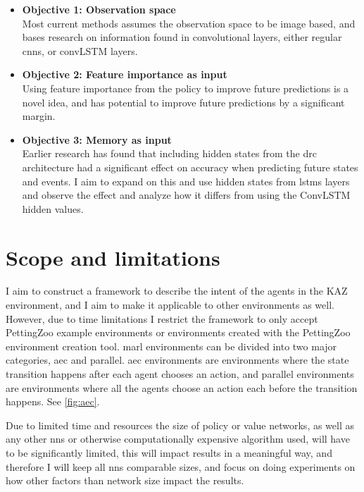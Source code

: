 \documentclass[UKenglish]{uiomasterthesis}
\begin{document}
\begin{itemize}

    \item \textbf{Objective 1: Observation space}\\
        Most current methods assumes the observation space to be image based, and bases research on information found in convolutional layers, either regular \acp{cnn}, or convLSTM layers.

    \item \textbf{Objective 2: Feature importance as input}\\
        Using feature importance from the policy to improve future predictions is a novel idea, and has potential to improve future predictions by a significant margin.

    \item \textbf{Objective 3: Memory as input}\\
        Earlier research has found that including hidden states from the \ac{drc} architecture had a significant effect on accuracy when predicting future states and events. I aim to expand on this and use hidden states from \acp{lstm} layers and observe the effect and analyze how it differs from using the ConvLSTM hidden values.

\end{itemize}


\section{Scope and limitations}
I aim to construct a framework to describe the intent of the agents in the KAZ environment, and I aim to make it applicable to other environments as well. However, due to time limitations I restrict the framework to only accept PettingZoo example environments or environments created with the PettingZoo environment creation tool. \ac{marl} environments can be divided into two major categories, \ac{aec} and parallel. \ac{aec} environments are environments where the state transition happens after each agent chooses an action, and parallel environments are environments where all the agents choose an action each before the transition happens. See \cref{fig:aec}.

Due to limited time and resources the size of policy or value networks, as well as any other \acp{nn} or otherwise computationally expensive algorithm used, will have to be significantly limited, this will impact results in a meaningful way, and therefore I will keep all \acp{nn} comparable sizes, and focus on doing experiments on how other factors than network size impact the results.
\end{document}
